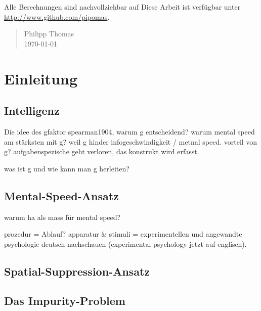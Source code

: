\documentclass[11pt, twoside, a4paper]{book}		%
\begin{document}
Alle Berechnungen sind nachvollziehbar auf 
Diese Arbeit ist verfügbar unter \url{http://www.github.com/pipomas}.

\vspace{6 mm}

\begin{quote}
Philipp Thomas\\
\today
\end{quote}



\mainmatter
{}		%


\chapter{Einleitung \label{cha:Einleitung}}

\section{Intelligenz \label{sec:Intelligenz}}
Die idee des gfaktor
spearman1904, warum g entscheidend? warum mental speed am stärksten mit g? weil g hinder infogeschwindigkeit / metnal speed.
vorteil von g? aufgabenspezische geht verloren, das konstrukt wird erfasst.

was ist g und wie kann man g herleiten?

\section{Mental-Speed-Ansatz \label{sec:lol}}
warum ha als mass für mental speed?

prozedur = Ablauf?
apparatur \& stimuli = 
experimentellen und angewandte psychologie deutsch nachschauen (experimental psychology jetzt auf englisch).

\citep{Doebler2015}

\section{Spatial-Suppression-Ansatz \label{sec:SpatialSuppression}}

\section{Das Impurity-Problem }
\end{document}
